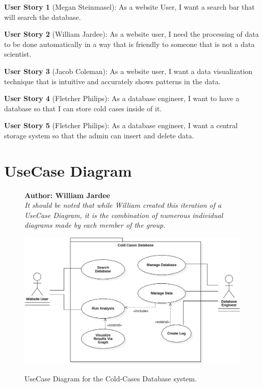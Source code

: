 \documentclass[11pt]{article}
\begin{document}
\noindent\textbf{\hypertarget{us1}{User Story 1}} (Megan Steinmasel):  As a website User, I want a search bar that will search the database.\vspace{0.5em}

\noindent\textbf{\hypertarget{us2}{User Story 2}} (William Jardee): As a website user, I need the processing of data to be done automatically in a way that is friendly to someone that is not a data scientist.\vspace{0.5em}

\noindent\textbf{\hypertarget{us3}{User Story 3}} (Jacob Coleman): As a website user, I want a data visualization technique that is intuitive and accurately shows patterns in the data.\vspace{0.5em}

\noindent\textbf{\hypertarget{us4}{User Story 4}} (Fletcher Philips): As a database engineer, I want to have a database so that I can store cold cases inside of it. \vspace{0.5em}

\noindent\textbf{\hypertarget{us5}{User Story 5}} (Fletcher Philips): As a database engineer, I want a central storage system so that the admin can insert and delete data.\vspace{0.5em}

\clearpage



\section*{UseCase Diagram}

\begin{figure}[!ht]
\centering
\textbf{Author: William Jardee}\\
\textit{It should be noted that while William created this iteration of a UseCase Diagram, it is the combination of numerous individual diagrams made by each member of the group.}\vspace{0.5em}

	\includegraphics[width=.95\textwidth]{./UseCases/jardee_usecase_3}\\
	\caption{UseCase Diagram for the Cold-Cases Database system.}
	\label{fig:usecase_diagram}
\end{figure}
\clearpage
\end{document}
